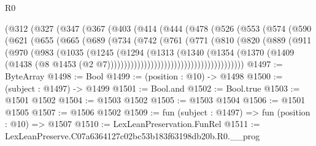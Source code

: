 \begin{lexlean}{R0}
\begin{coremodule}
            (@312
              (@327
                (@347
                  (@367
                    (@403
                      (@414
                        (@444
                          (@478
                            (@526
                              (@553
                                (@574
                                  (@590
                                    (@621
                                      (@655
                                        (@665
                                          (@689
                                            (@734
                                              (@742
                                                (@761
                                                  (@771
                                                    (@810
                                                      (@820
                                                        (@889
                                                          (@911
                                                            (@970
                                                              (@983
                                                                (@1035
                                                                  (@1245
                                                                    (@1294
                                                                      (@1313
                                                                        (@1340
                                                                          (@1354
                                                                            (@1370
                                                                              (@1409
                                                                                (@1438
                                                                                  (@8
                                                                                    @1453
                                                                                    (@2
                                                                                      @7)))))))))))))))))))))))))))))))))))))))))
@1497 := ByteArray
@1498 := Bool
@1499 := (position : @10) -> @1498
@1500 := (subject : @1497) -> @1499
@1501 := Bool.and
@1502 := Bool.true
@1503 := @1501 @1502
@1504 := @1503 @1502
@1505 := @1503 @1504
@1506 := @1501 @1505
@1507 := @1506 @1502
@1509 := fun (subject : @1497) => fun (position : @10) => @1507
@1510 := LexLeanPreservation.FunRel
@1511 := LexLeanPreserve.C07a6364127c02bc53b183f63198db20b.R0.__prog

\end{coremodule}
\end{lexlean}
